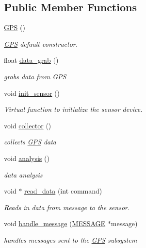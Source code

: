 \subsection*{Public Member Functions}
\begin{DoxyCompactItemize}
\item 
\hyperlink{classGPS_a0c347a188512d0d5cf7ed5c91b145fc4}{G\-P\-S} ()
\begin{DoxyCompactList}\small\item\em \hyperlink{classGPS}{G\-P\-S} default constructor. \end{DoxyCompactList}\item 
float \hyperlink{classGPS_a2276d26044fb15e498c52b4ee5bcaa91}{data\-\_\-grab} ()
\begin{DoxyCompactList}\small\item\em grabs data from \hyperlink{classGPS}{G\-P\-S} \end{DoxyCompactList}\item 
void \hyperlink{classGPS_aebb999362899800a7e372e873bb5b943}{init\-\_\-sensor} ()
\begin{DoxyCompactList}\small\item\em Virtual function to initialize the sensor device. \end{DoxyCompactList}\item 
void \hyperlink{classGPS_a17383568c4ed86a0adfdd5c88b6591d4}{collector} ()
\begin{DoxyCompactList}\small\item\em collects \hyperlink{classGPS}{G\-P\-S} data \end{DoxyCompactList}\item 
void \hyperlink{classGPS_a4dca50736c5e49f831515219536823b2}{analysis} ()
\begin{DoxyCompactList}\small\item\em data analysis \end{DoxyCompactList}\item 
void $\ast$ \hyperlink{classGPS_aa04076536ee9f7e2679895c69b07ad58}{read\-\_\-data} (int command)
\begin{DoxyCompactList}\small\item\em Reads in data from message to the sensor. \end{DoxyCompactList}\item 
\hypertarget{classGPS_a803a498352e30044136502a9e036d380}{void \hyperlink{classGPS_a803a498352e30044136502a9e036d380}{handle\-\_\-message} (\hyperlink{SUBSYS__COMMANDS_8h_ad814416fc1a8c675bea2687d96088a8f}{M\-E\-S\-S\-A\-G\-E} $\ast$message)}\label{classGPS_a803a498352e30044136502a9e036d380}

\begin{DoxyCompactList}\small\item\em handles messages sent to the \hyperlink{classGPS}{G\-P\-S} subsystem \end{DoxyCompactList}\end{DoxyCompactItemize}
